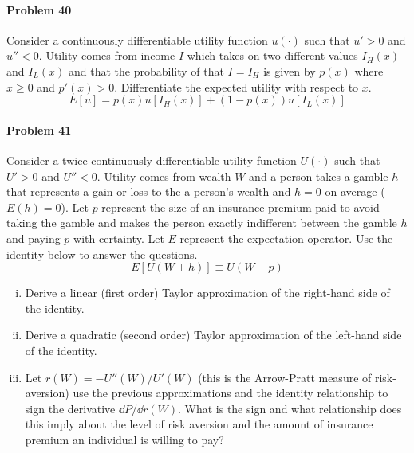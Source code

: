 \documentclass[a4paper, 11pt]{article}
\begin{document}

\paragraph{Problem 40}
Consider a continuously differentiable utility function $u(\cdot)$ such that $u'>0$ and $u'' < 0$.
Utility comes from income $I$ which takes on two different values $I_H(x)$ and $I_L(x)$ and that the probability of that $I=I_H$ is given by $p(x)$ where $x\geq 0$ and $p'(x)>0$.
Differentiate the expected utility with respect to $x$.
\[
	E[u] = p(x)u[I_H(x)] + (1-p(x))u[I_L(x)]
\]


\paragraph{Problem 41}
Consider a twice continuously differentiable utility function $U(\cdot)$ such that $U'>0$ and $U''< 0$.
Utility comes from wealth $W$ and a person takes a gamble $h$ that represents a gain or loss to the a person's wealth and $h=0$ on average ($E(h)=0$).
Let $p$ represent the size of an insurance premium paid to avoid taking the gamble and makes the person exactly indifferent between the gamble $h$ and paying $p$ with certainty.
Let $E$ represent the expectation operator.
Use the identity below to answer the questions.
\[
	E[U(W + h)] \equiv U(W-p)
\]
\begin{enumerate}[(i)]
	\item Derive a linear (first order) Taylor approximation of the right-hand side of the identity.
	\item Derive a quadratic (second order) Taylor approximation of the left-hand side of the identity.
	\item Let $r(W) = -U''(W)/U'(W)$ (this is the Arrow-Pratt measure of risk-aversion) use the previous approximations and the identity relationship to sign the derivative $\dd P / \dd r(W)$.  What is the sign and what relationship does this imply about the level of risk aversion and the amount of insurance premium an individual is willing to pay?
\end{enumerate}
\end{document}
